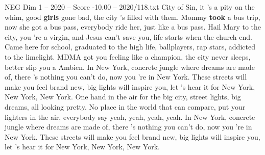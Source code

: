 \begin{textsample}{NEG Dim 1 – 2020 – Score -10.00 – 2020/118.txt}
City of Sin, it 's a pity on the whim, good \textbf{girls} gone bad, the city 's filled with them.
Mommy \textbf{took} a bus trip, now she got a bus pass, everybody ride her, just like a bus pass.
Hail Mary to the city, you 're a virgin, and Jesus can't save you, life starts when the church end.
Came here for school, graduated to the high life, ballplayers, rap stars, addicted to the limelight.
MDMA got you feeling like a champion, the city never sleeps, better slip you a Ambien.
In New York, concrete jungle where dreams are made of, there 's nothing you can't do, now you 're in New York.
These streets will make you feel brand new, big lights will inspire you, let 's hear it for New York, New York, New York.
One hand in the air for the big city, street lights, big dreams, all looking pretty.
No place in the world that can compare, put your lighters in the air, everybody say yeah, yeah, yeah, yeah.
In New York, concrete jungle where dreams are made of, there 's nothing you can't do, now you 're in New York.
These streets will make you feel brand new, big lights will inspire you, let 's hear it for New York, New York, New York.

\end{textsample}
